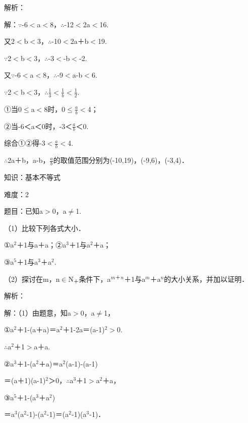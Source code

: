 \documentclass{article} %
\begin{document}
解析：

解：$\mathrm{\because}$-6$\mathrm{<}$a$\mathrm{<}$8，$\mathrm{\therefore}$-12$\mathrm{<}$2a$\mathrm{<}$16.

又2$\mathrm{<}$b$\mathrm{<}$3，$\mathrm{\therefore}$-10$\mathrm{<}$2a＋b$\mathrm{<}$19.

$\mathrm{\because}$2$\mathrm{<}$b$\mathrm{<}$3，$\mathrm{\therefore}$-3$\mathrm{<}$-b$\mathrm{<}$-2.

又$\mathrm{\because}$-6$\mathrm{<}$a$\mathrm{<}$8，$\mathrm{\therefore}$-9$\mathrm{<}$a-b$\mathrm{<}$6.

$\mathrm{\because}$2$\mathrm{<}$b$\mathrm{<}$3，$\mathrm{\therefore}$$\frac{1}{3}$$\mathrm{<}$$\frac{1}{b}$$\mathrm{<}$$\frac{1}{2}$.

①当0$\mathrm{\le}$a$\mathrm{<}$8时，0$\mathrm{\le}$$\frac{a}{b}$$\mathrm{<}$4；

②当-6＜a＜0时，-3＜$\frac{a}{b}$＜0.

综合①②得-3$\mathrm{<}$$\frac{a}{b}$$\mathrm{<}$4.

$\mathrm{\therefore}$2a＋b，a-b，$\frac{a}{b}$的取值范围分别为(-10,19)，(-9,6)，(-3,4)．



知识：基本不等式

难度：2

题目：已知a$\mathrm{>}$0，a$\mathrm{\neq}$1.

（1）比较下列各式大小．

①a${}^{2}$＋1与a＋a；②a${}^{3}$＋1与a${}^{2}$＋a；

③a${}^{5}$＋1与a${}^{3}$＋a${}^{2}$.

（2）探讨在m，n$\mathrm{\in}$N${}_{\textrm{＋}}$条件下，a${}^{m}$${}^{\textrm{＋}}$${}^{n}$＋1与a${}^{m}$＋a${}^{n}$的大小关系，并加以证明．

解析：

解：（1）由题意，知a$\mathrm{>}$0，a$\mathrm{\neq}$1，

①a${}^{2}$＋1-(a＋a)＝a${}^{2}$＋1-2a＝(a-1)${}^{2}$$\mathrm{>}$0.

$\mathrm{\therefore}$a${}^{2}$＋1$\mathrm{>}$a＋a.

②a${}^{3}$＋1-(a${}^{2}$＋a)＝a${}^{2}$(a-1)-(a-1)

＝(a＋1)(a-1)${}^{2}$＞0，$\mathrm{\therefore}$a${}^{3}$＋1$\mathrm{>}$a${}^{2}$＋a，

③a${}^{5}$＋1-(a${}^{3}$＋a${}^{2}$)

＝a${}^{3}$(a${}^{2}$-1)-(a${}^{2}$-1)＝(a${}^{2}$-1)(a${}^{3}$-1)．
\end{document}
